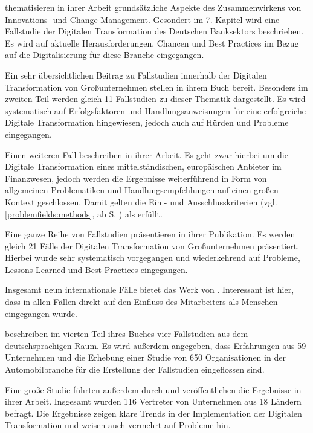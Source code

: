  thematisieren in ihrer Arbeit grundsätzliche Aspekte des Zusammenwirkens von Innovations- und Change Management. Gesondert im 7. Kapitel wird eine Fallstudie der Digitalen Transformation des Deutschen Banksektors  beschrieben. Es wird auf aktuelle Herausforderungen, Chancen und Best Practices im Bezug auf die Digitalisierung für diese Branche eingegangen.

Ein sehr übersichtlichen Beitrag zu Fallstudien innerhalb der Digitalen Transformation von Großunternehmen stellen  in ihrem Buch bereit. Besonders im zweiten Teil werden gleich 11  Fallstudien zu dieser Thematik dargestellt. Es wird systematisch auf Erfolgsfaktoren und Handlungsanweisungen für  eine erfolgreiche Digitale Transformation hingewiesen, jedoch auch auf Hürden und Probleme eingegangen.

Einen weiteren Fall beschreiben  in ihrer Arbeit. Es geht zwar hierbei um die Digitale Transformation eines mittelständischen, europäischen Anbieter im Finanzwesen, jedoch werden die Ergebnisse weiterführend in Form von allgemeinen Problematiken und Handlungsempfehlungen auf einen großen Kontext geschlossen. Damit gelten die Ein - und Ausschlusskriterien (vgl. \ref{problemfields:methods}, ab S. \pageref{problemfields:methods}) als erfüllt.

Eine ganze Reihe von Fallstudien präsentieren  in ihrer Publikation. Es werden gleich 21 Fälle der Digitalen Transformation von Großunternehmen präsentiert. Hierbei wurde sehr systematisch vorgegangen und  wiederkehrend auf Probleme, Lessons Learned und Best Practices eingegangen.

Insgesamt neun internationale Fälle bietet das Werk von . Interessant ist hier, dass in allen Fällen direkt auf den Einfluss des Mitarbeiters als Menschen eingegangen wurde.

 beschreiben im vierten Teil ihres Buches vier Fallstudien aus dem deutschsprachigen Raum. Es wird außerdem angegeben, dass Erfahrungen aus 59 Unternehmen und die Erhebung einer Studie von 650 Organisationen in der Automobilbranche für die Erstellung der Fallstudien eingeflossen sind.

Eine große Studie führten außerdem  durch und veröffentlichen die Ergebnisse in ihrer Arbeit. Insgesamt wurden 116 Vertreter von Unternehmen aus 18 Ländern befragt. Die Ergebnisse zeigen klare  Trends in der Implementation der Digitalen Transformation und weisen auch vermehrt auf Probleme hin.

